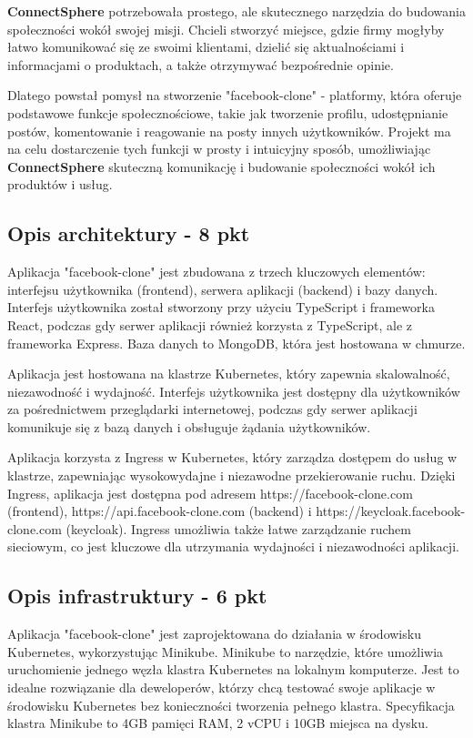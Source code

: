 \documentclass[12pt,a4paper]{article}
\begin{document}
\textbf{ConnectSphere} potrzebowała prostego, ale skutecznego narzędzia do budowania społeczności wokół swojej misji. Chcieli stworzyć miejsce, gdzie firmy mogłyby łatwo komunikować się ze swoimi klientami, dzielić się aktualnościami i informacjami o produktach, a także otrzymywać bezpośrednie opinie.

Dlatego powstał pomysł na stworzenie "facebook-clone" - platformy, która oferuje podstawowe funkcje społecznościowe, takie jak tworzenie profilu, udostępnianie postów, komentowanie i reagowanie na posty innych użytkowników. Projekt ma na celu dostarczenie tych funkcji w prosty i intuicyjny sposób, umożliwiając \textbf{ConnectSphere} skuteczną komunikację i budowanie społeczności wokół ich produktów i usług.

\subsection{Opis architektury - 8 pkt}
\label{sec:introduction}
Aplikacja "facebook-clone" jest zbudowana z trzech kluczowych elementów: interfejsu użytkownika (frontend), serwera aplikacji (backend) i bazy danych. Interfejs użytkownika został stworzony przy użyciu TypeScript i frameworka React, podczas gdy serwer aplikacji również korzysta z TypeScript, ale z frameworka Express. Baza danych to MongoDB, która jest hostowana w chmurze.

Aplikacja jest hostowana na klastrze Kubernetes, który zapewnia skalowalność, niezawodność i wydajność. Interfejs użytkownika jest dostępny dla użytkowników za pośrednictwem przeglądarki internetowej, podczas gdy serwer aplikacji komunikuje się z bazą danych i obsługuje żądania użytkowników.

Aplikacja korzysta z Ingress w Kubernetes, który zarządza dostępem do usług w klastrze, zapewniając wysokowydajne i niezawodne przekierowanie ruchu. Dzięki Ingress, aplikacja jest dostępna pod adresem https://facebook-clone.com (frontend), https://api.facebook-clone.com (backend) i https://keycloak.facebook-clone.com (keycloak). Ingress umożliwia także łatwe zarządzanie ruchem sieciowym, co jest kluczowe dla utrzymania wydajności i niezawodności aplikacji.


\subsection{Opis infrastruktury - 6 pkt}
\label{sec:Users}

Aplikacja "facebook-clone" jest zaprojektowana do działania w środowisku Kubernetes, wykorzystując Minikube. Minikube to narzędzie, które umożliwia uruchomienie jednego węzła klastra Kubernetes na lokalnym komputerze. Jest to idealne rozwiązanie dla deweloperów, którzy chcą testować swoje aplikacje w środowisku Kubernetes bez konieczności tworzenia pełnego klastra. Specyfikacja klastra Minikube to 4GB pamięci RAM, 2 vCPU i 10GB miejsca na dysku.
\end{document}
